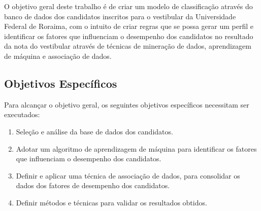 O objetivo geral deste trabalho é de criar um modelo de classificação através do banco de dados dos candidatos inscritos para o vestibular da Universidade Federal de Roraima, com o intuito de criar regras que se possa gerar um perfil e identificar os fatores que influenciam o desempenho dos candidatos no resultado da nota do vestibular através de técnicas de mineração de dados, aprendizagem de máquina e associação de dados.


\subsection{Objetivos Específicos}

Para alcançar o objetivo geral, os seguintes objetivos específicos necessitam ser executados:


\begin{enumerate}
  \item Seleção e análise da base de dados dos candidatos.
  \item Adotar um algoritmo de aprendizagem de máquina para identificar os fatores que influenciam o desempenho dos candidatos.
  \item Definir e aplicar uma técnica de associação de dados, para consolidar os dados dos fatores de desempenho dos candidatos.
  \item Definir métodos e técnicas para validar os resultados obtidos.
\end{enumerate}






